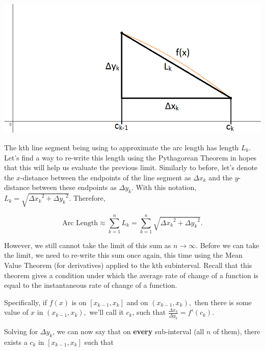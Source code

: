 \documentclass[handout,nooutcomes]{ximera}
\begin{document}
\begin{center} \includegraphics{generalpythagorean.png} \end{center}

The kth line segment being using to approximate the arc length has length $L_k$.  Let's find a way to re-write this length using the Pythagorean Theorem in hopes that this will help us evaluate the previous limit.  Similarly to before, let's denote the $x$-distance between the endpoints of the line segment as ${\Delta x}_k$ and the $y$-distance between these endpoints as ${\Delta y}_k$.  With this notation, $L_k = \sqrt{{{\Delta x}_k}^2+{{\Delta y}_k}^2}$.  Therefore, 

$$\text{Arc Length} \approx \displaystyle\sum_{k=1}^n L_k = \displaystyle\sum_{k=1}^n \sqrt{{{\Delta x}_k}^2+{{\Delta y}_k}^2}.$$

However, we still cannot take the limit of this sum as $n \to \infty$.  Before we can take the limit, we need to re-write this sum once again, this time using the Mean Value Theorem (for derivatives) applied to the kth subinterval.  Recall that this theorem gives a condition under which the average rate of change of a function is equal to the instantaneous rate of change of a function.

\begin{problem}
Specifically, if $f(x)$ is  on $[x_{k-1},x_k]$ and  on $(x_{k-1},x_k),$ then there is some value of $x$ in $(x_{k-1},x_k),$ we'll call it $c_k$, such that $\frac{\Delta x_k}{\Delta y_k} = f'(c_k).$ 
\end{problem}

Solving for $\Delta y_k$, we can now say that on \textbf{every} sub-interval (all $n$ of them), there exists a $c_k$ in $[x_{k-1}, x_k]$ such that
\end{document}
